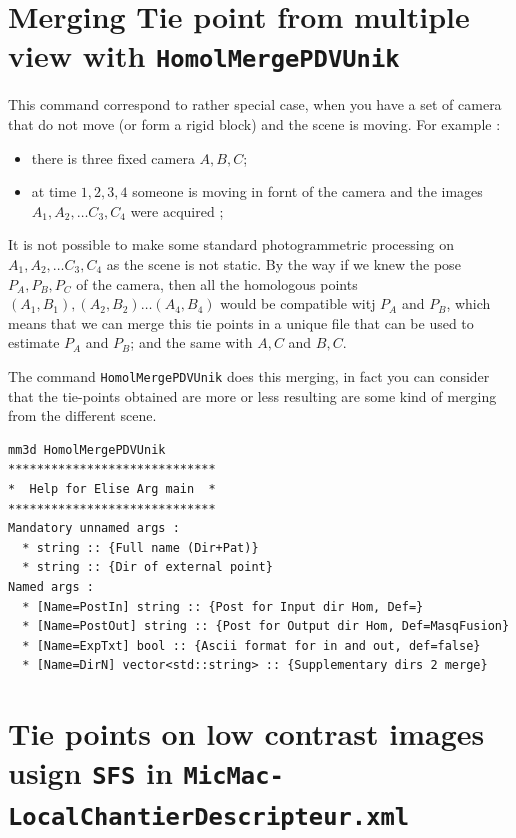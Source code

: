 
\section{Merging Tie point from multiple view with {\tt HomolMergePDVUnik}}

This command correspond to rather special case, when you have a set of camera that do not move (or form a rigid block) and the scene is moving.
For example :

\begin{itemize}
    \item there is three fixed camera $A,B,C$;
    \item at time $1,2,3,4$ someone is moving in fornt of the camera and the images $A_1,A_2, \dots C_3,C_4$ were acquired ;
\end{itemize}

It is not possible to make some standard photogrammetric processing on $A_1,A_2, \dots C_3,C_4$ as the scene is not static.
By the way if we knew the pose  $P_A,P_B,P_C$ of the camera, then  all the homologous points $(A_1,B_1), (A_2,B_2) \dots (A_4,B_4)$ 
would be compatible witj $P_A$ and $P_B$, which means that we can merge this tie points in a unique file that can be used
to estimate $P_A$ and $P_B$; and the same with $A,C$ and $B,C$. 


The command  {\tt HomolMergePDVUnik} does this merging, in fact you can consider that the tie-points 
obtained are more or less resulting are some kind of merging from the different scene. 

\begin{verbatim}
mm3d HomolMergePDVUnik
*****************************
*  Help for Elise Arg main  *
*****************************
Mandatory unnamed args : 
  * string :: {Full name (Dir+Pat)}
  * string :: {Dir of external point}
Named args : 
  * [Name=PostIn] string :: {Post for Input dir Hom, Def=}
  * [Name=PostOut] string :: {Post for Output dir Hom, Def=MasqFusion}
  * [Name=ExpTxt] bool :: {Ascii format for in and out, def=false}
  * [Name=DirN] vector<std::string> :: {Supplementary dirs 2 merge}
\end{verbatim}



\section{Tie points on low contrast images usign {\tt SFS} in {\tt MicMac-LocalChantierDescripteur.xml}}


